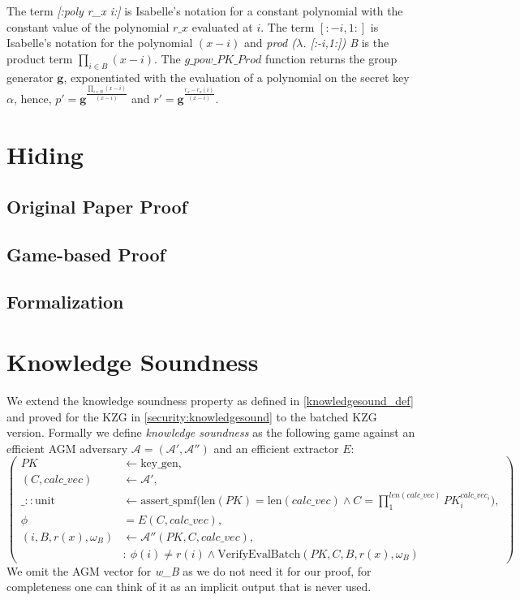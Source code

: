 The term \textit{[:poly r\_x i:]} is Isabelle's notation for a constant polynomial with the constant value of the polynomial $r\_x$ evaluated at $i$. The term $[:-i,1:]$ is Isabelle's notation for the polynomial $(x-i)$ and \textit{prod ($\lambda$. [:-i,1:]) B} is the product term $\prod_{i\in B}^{}(x-i)$. The $g\_pow\_PK\_Prod$ function returns the group generator $\mathbf{g}$, exponentiated with the evaluation of a polynomial on the secret key $\alpha$, hence, $p'=\mathbf{g}^{\frac{\prod_{i\in B}^{}(x-i)}{(x-i)}}$ and $r'=\mathbf{g}^{\frac{r_x-r_x(i)}{(x-i)}}$.

\section{Hiding}

\subsection{Original Paper Proof}

\subsection{Game-based Proof}

\subsection{Formalization}

\section{Knowledge Soundness}
We extend the knowledge soundness property as defined in \ref{knowledgesound_def}
and proved for the KZG in \ref{security:knowledgesound} to the batched KZG version. Formally we define \textit{knowledge soundness} as the following game against an efficient AGM adversary $\mathcal{A=(A',A'')}$ and an efficient extractor $E$: 
\begin{equation*}
    \left(
        \begin{aligned}
            PK &\leftarrow \text{key\_gen}, \\
            (C,calc\_vec) &\leftarrow \mathcal{A'}, \\
            \_::\text{unit} &\leftarrow \text{assert\_spmf}\biggl(\text{len}(PK)=\text{len}(calc\_vec) \land C = \prod_{1}^{len(calc\_vec)}PK_i^{calc\_vec_i}\biggr), \\
            \phi &= E(C, calc\_vec),\\
            (i, B, r(x), \omega_B) &\leftarrow \mathcal{A''}(PK, C, calc\_vec), \\
            & : \ \phi(i) \ne r(i) \land \text{VerifyEvalBatch}(PK,C,B,r(x),\omega_B)
        \end{aligned}
        \right)
\end{equation*}
We omit the AGM vector for \textit{w\_B} as we do not need it for our proof, for completeness one can think of it as an implicit output that is never used.

